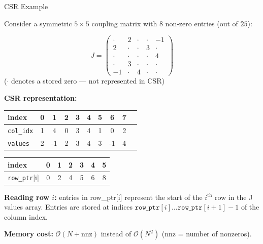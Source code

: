 \documentclass[9pt]{beamer}
\begin{document}
\begin{frame}{CSR Example}

Consider a symmetric $5 \times 5$ coupling matrix with $8$ non-zero entries (out of $25$):

\medskip
\begin{minipage}{0.42\textwidth}
\centering
\[
J =
\begin{pmatrix}
\cdot &  2  & \cdot & \cdot & -1 \\
 2  & \cdot & \cdot &  3  & \cdot \\
\cdot & \cdot & \cdot & \cdot &  4  \\
\cdot &  3  & \cdot & \cdot & \cdot \\
-1  & \cdot &  4  & \cdot & \cdot
\end{pmatrix}
\]
{\scriptsize ($\cdot$ denotes a stored zero — not represented in CSR)}
\end{minipage}%
\hfill
\begin{minipage}{0.55\textwidth}
\textbf{CSR representation:}

\smallskip
\scriptsize
\setlength{\tabcolsep}{4pt}
\renewcommand{\arraystretch}{1.3}
\begin{tabular}{l|*{9}{c}}
index               & 0 & 1 & 2 & 3 & 4 & 5 & 6 & 7 & \\
\hline
\texttt{col\_idx} & 1 & 4 & 0 & 3 & 4 & 1 & 0 & 2 & \\
\texttt{values}   & 2 & -1 & 2 & 3 & 4 & 3 & -1 & 4 & \\
\end{tabular}

\medskip
\begin{tabular}{l|*{6}{c}}
index              & 0 & 1 & 2 & 3 & 4 & 5 \\
\hline
\texttt{row\_ptr}[i] & 0 & 2 & 4 & 5 & 6 & 8 \\
\end{tabular}
\end{minipage}

\medskip
\textbf{Reading row $i$:} entries in row\_ptr[i] represent the start of the $i^{\text{th}}$ row in the J values array. Entries are stored at indices $\texttt{row\_ptr}[i] \dots \texttt{row\_ptr}[i{+}1]{-}1$ of the column index.

\vspace{0.2cm}
\textbf{Memory cost:} $\mathcal{O}(N + \text{nnz})$ instead of $\mathcal{O}(N^2)$ (nnz = number of nonzeros).

\end{frame}
\end{document}
